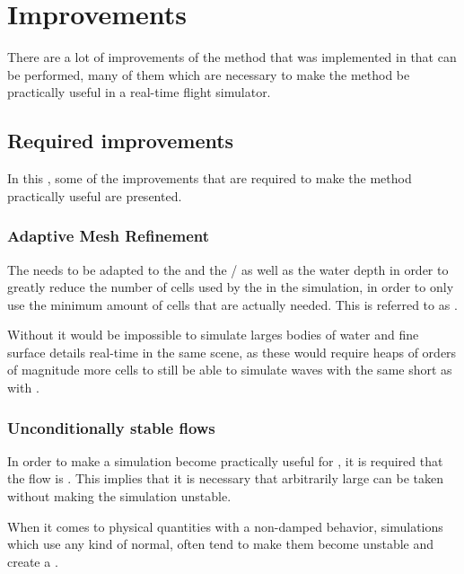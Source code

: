 \chapter{Improvements}

There are a lot of improvements of the method that was implemented in \thisprojectwork that can be performed, many of them which are necessary  to make the method be practically useful in a real-time flight simulator.

\section{Required improvements}

In this \levelname, some of the improvements that are required to make the method practically useful are presented.

\subsection{Adaptive Mesh Refinement}

The \LOD needs to be adapted to the  and the \FOV/ as well as the water depth in order to greatly reduce the number of cells used by the \FVM in the simulation, in order to only use the minimum amount of cells that are actually needed. This is referred to as \AMR.

Without \AMR it would be impossible to simulate larges bodies of water and fine surface details real-time in the same scene, as these would require heaps of orders of magnitude more cells to still be able to simulate waves with the same short \wavelength as with \AMR.

\subsection{Unconditionally stable flows}

In order to make a \FVM simulation become practically useful for , it is required that the flow is . This implies that it is necessary that arbitrarily large \timesteps can be taken without making the simulation unstable.

When it comes to physical quantities with a non-damped \oscillating behavior, simulations which use any kind of normal,  often tend to make them become unstable and create a .

